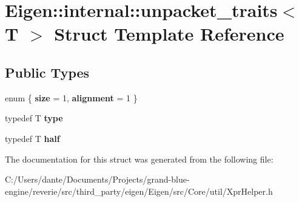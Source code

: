 \hypertarget{struct_eigen_1_1internal_1_1unpacket__traits}{}\section{Eigen\+::internal\+::unpacket\+\_\+traits$<$ T $>$ Struct Template Reference}
\label{struct_eigen_1_1internal_1_1unpacket__traits}
\subsection*{Public Types}
\begin{DoxyCompactItemize}
\item 
\mbox{\label{struct_eigen_1_1internal_1_1unpacket__traits_aeb5e2d721dff7ae4efdb922a8d1cf459}} 
enum \{ {\bfseries size} = 1, 
{\bfseries alignment} = 1
 \}
\item 
\mbox{\label{struct_eigen_1_1internal_1_1unpacket__traits_a5ee5854983d337c190b4e8f12e32e03d}} 
typedef T {\bfseries type}
\item 
\mbox{\label{struct_eigen_1_1internal_1_1unpacket__traits_a832cbd167bb00a6b31296cfe384b2f76}} 
typedef T {\bfseries half}
\end{DoxyCompactItemize}


The documentation for this struct was generated from the following file\+:\begin{DoxyCompactItemize}
\item 
C\+:/\+Users/dante/\+Documents/\+Projects/grand-\/blue-\/engine/reverie/src/third\+\_\+party/eigen/\+Eigen/src/\+Core/util/Xpr\+Helper.\+h\end{DoxyCompactItemize}
